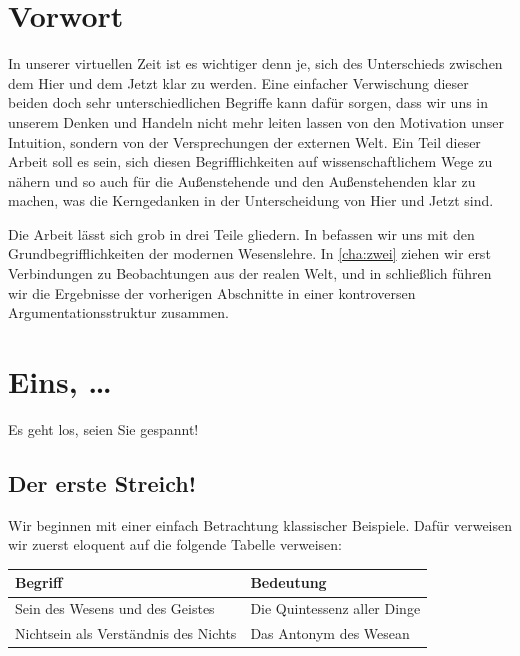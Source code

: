 \documentclass{scrbook}
\begin{document}
\chapter*{Vorwort}

In unserer virtuellen Zeit ist es wichtiger denn je, sich des Unterschieds
zwischen dem Hier und dem Jetzt klar zu werden.  Eine einfacher Verwischung
dieser beiden doch sehr unterschiedlichen Begriffe kann dafür sorgen, dass wir
uns in unserem Denken und Handeln nicht mehr leiten lassen von den Motivation
unser Intuition, sondern von der Versprechungen der externen Welt.  Ein Teil
dieser Arbeit soll es sein, sich diesen Begrifflichkeiten auf wissenschaftlichem
Wege zu nähern und so auch für die Außenstehende und den Außenstehenden klar zu
machen, was die Kerngedanken in der Unterscheidung von Hier und Jetzt sind.

Die Arbeit lässt sich grob in drei Teile gliedern.  In  befassen
wir uns mit den Grundbegrifflichkeiten der modernen Wesenslehre.  In
\ref{cha:zwei} ziehen wir erst Verbindungen zu Beobachtungen aus der realen
Welt, und in  schließlich führen wir die Ergebnisse der
vorherigen Abschnitte in einer kontroversen Argumentationsstruktur zusammen.

\cleardoublepage

\tableofcontents

\mainmatter

\chapter{Eins, \dots}
\label{cha:eins}

Es geht los, seien Sie gespannt!

\section{Der erste Streich!}
\label{sec:der-erste-streich}

Wir beginnen mit einer einfach Betrachtung klassischer Beispiele.  Dafür
verweisen wir zuerst eloquent auf die folgende Tabelle verweisen:

\begin{center}
  \begin{tabu}{XX}
    \toprule
    Begriff & Bedeutung \\\midrule
    Sein des Wesens und des Geistes & Die Quintessenz aller Dinge \\
    Nichtsein als Verständnis des Nichts & Das Antonym des Wesean \\
    \bottomrule
  \end{tabu}
\end{center}
\end{document}
